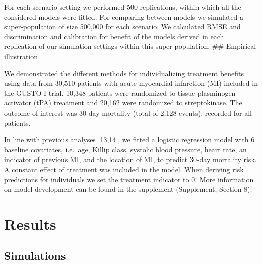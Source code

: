 \documentclass[]{elsarticle} %
\begin{document}
For each scenario setting we performed 500 replications, within which
all the considered models were fitted. For comparing between models we
simulated a super-population of size 500,000 for each scenario. We
calculated RMSE and discrimination and calibration for benefit of the
models derived in each replication of our simulation settings within
this super-population. \#\# Empirical illustration

We demonstrated the different methods for individualizing treatment
benefits using data from 30,510 patients with acute myocardial
infarction (MI) included in the GUSTO-I trial. 10,348 patients were
randomized to tissue plasminogen activator (tPA) treatment and 20,162
were randomized to streptokinase. The outcome of interest was 30-day
mortality (total of 2,128 events), recorded for all patients.

In line with previous analyses {[}13,14{]}, we fitted a logistic
regression model with 6 baseline covariates, i.e.~age, Killip class,
systolic blood pressure, heart rate, an indicator of previous MI, and
the location of MI, to predict 30-day mortality risk. A constant effect
of treatment was included in the model. When deriving risk predictions
for individuals we set the treatment indicator to 0. More information on
model development can be found in the supplement (Supplement, Section
8).

\hypertarget{results}{%
\section{Results}\label{results}}

\hypertarget{simulations}{%
\subsection{Simulations}\label{simulations}}
\end{document}
